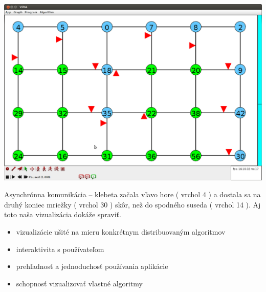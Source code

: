 \includegraphics[width=\columnwidth]{asyn}
\caption{Asynchrónna komunikácia -- klebeta začala vľavo hore ( vrchol 4 ) a dostala sa na druhý
koniec mriežky ( vrchol 30 ) skôr, než do spodného suseda ( vrchol 14 ). Aj toto naša vizualizácia
dokáže spraviť. }

\begin{itemize}

    \item vizualizácie ušité na mieru konkrétnym distribuovaným algoritmov
    \item interaktivita s používateľom
    \item prehľadnosť a jednoduchosť používania aplikácie
    \item schopnosť vizualizovať vlastné algoritmy

\end{itemize}

